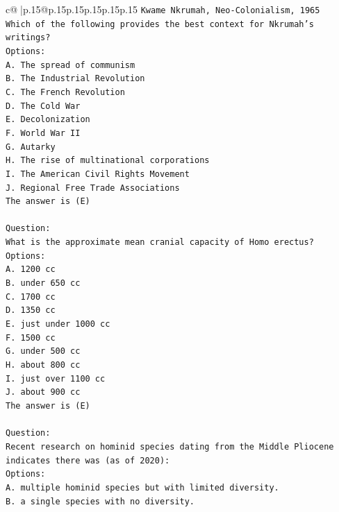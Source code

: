 \documentclass{article}
\begin{document}
{\begin{supertabular}{c@{$\;$}|p{.15\linewidth}@{}p{.15\linewidth}p{.15\linewidth}p{.15\linewidth}p{.15\linewidth}p{.15\linewidth}}
{{{\texttt{Kwame Nkrumah, Neo{-}Colonialism, 1965} \\
\texttt{Which of the following provides the best context for Nkrumah's writings?} \\
\texttt{Options:} \\
\texttt{A. The spread of communism} \\
\texttt{B. The Industrial Revolution} \\
\texttt{C. The French Revolution} \\
\texttt{D. The Cold War} \\
\texttt{E. Decolonization} \\
\texttt{F. World War II} \\
\texttt{G. Autarky} \\
\texttt{H. The rise of multinational corporations} \\
\texttt{I. The American Civil Rights Movement} \\
\texttt{J. Regional Free Trade Associations} \\
\texttt{The answer is (E)} \\
\\ 
\texttt{Question:} \\
\texttt{What is the approximate mean cranial capacity of Homo erectus?} \\
\texttt{Options:} \\
\texttt{A. 1200 cc} \\
\texttt{B. under 650 cc} \\
\texttt{C. 1700 cc} \\
\texttt{D. 1350 cc} \\
\texttt{E. just under 1000 cc} \\
\texttt{F. 1500 cc} \\
\texttt{G. under 500 cc} \\
\texttt{H. about 800 cc} \\
\texttt{I. just over 1100 cc} \\
\texttt{J. about 900 cc} \\
\texttt{The answer is (E)} \\
\\ 
\texttt{Question:} \\
\texttt{Recent research on hominid species dating from the Middle Pliocene indicates there was (as of 2020):} \\
\texttt{Options:} \\
\texttt{A. multiple hominid species but with limited diversity.} \\
\texttt{B. a single species with no diversity.} \\
}}}
\end{supertabular}}
\end{document}
